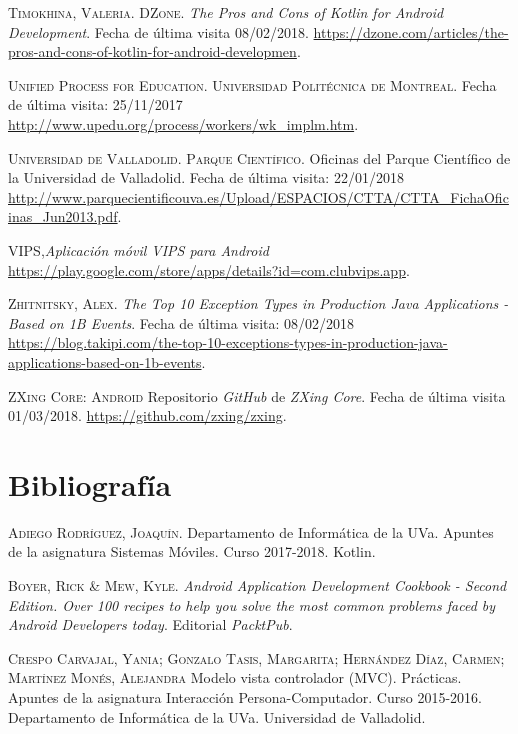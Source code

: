 \documentclass[twoside]{report}
\begin{document}
\begin{thebibliography}{a}
 \textsc{Timokhina, Valeria. DZone}. \textit{The Pros and Cons of Kotlin for Android Development}. Fecha de última visita 08/02/2018. \url{https://dzone.com/articles/the-pros-and-cons-of-kotlin-for-android-developmen}.

 \textsc{Unified Process for Education. Universidad Politécnica de Montreal}. Fecha de última visita: 25/11/2017 \url{http://www.upedu.org/process/workers/wk_implm.htm}.

 \textsc{Universidad de Valladolid. Parque Científico}. Oficinas del Parque Científico de la Universidad de Valladolid. Fecha de última visita: 22/01/2018 \url{http://www.parquecientificouva.es/Upload/ESPACIOS/CTTA/CTTA_FichaOficinas_Jun2013.pdf}.

 \textsc{VIPS},\textit{Aplicación móvil VIPS para Android} \url{https://play.google.com/store/apps/details?id=com.clubvips.app}.

 \textsc{Zhitnitsky, Alex}. \textit{The Top 10 Exception Types in Production Java Applications - Based on 1B Events}. Fecha de última visita: 08/02/2018 \url{https://blog.takipi.com/the-top-10-exceptions-types-in-production-java-applications-based-on-1b-events}.

 \textsc{ZXing Core: Android} 
Repositorio \textit{GitHub} de \textit{ZXing Core}. Fecha de última visita 01/03/2018. \url{https://github.com/zxing/zxing}.

\section{Bibliografía}

 \textsc{Adiego Rodríguez, Joaquín}. Departamento de Informática de la UVa. Apuntes de la asignatura Sistemas Móviles. Curso 2017-2018. Kotlin.

 \textsc{Boyer, Rick \& Mew, Kyle}. \textit{Android Application Development Cookbook - Second Edition. Over 100 recipes to help you solve the most common problems faced by Android Developers today}. Editorial \textit{PacktPub}.

 \textsc{Crespo Carvajal, Yania; Gonzalo Tasis, Margarita; Hernández Díaz, Carmen; Martínez Monés, Alejandra} Modelo vista controlador (MVC). Prácticas. Apuntes de la asignatura Interacción Persona-Computador. Curso 2015-2016. Departamento de Informática de la UVa. Universidad de Valladolid. 


\end{thebibliography}
\end{document}
